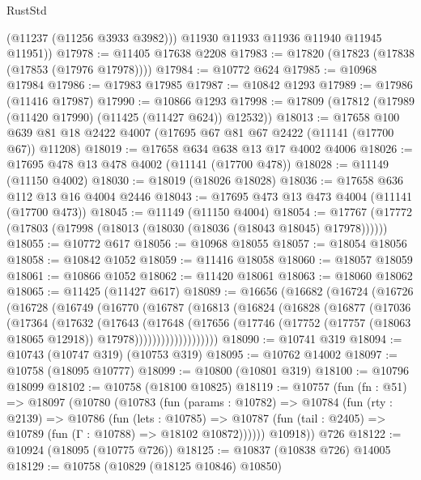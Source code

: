 \begin{lexlean}{RustStd}
\begin{coremodule}
          (@11237 (@11256 @3933 @3982)))
        @11930
        @11933
        @11936
        @11940
        @11945
        @11951))
@17978 := @11405 @17638 @2208
@17983 := @17820 (@17823 (@17838 (@17853 (@17976 @17978))))
@17984 := @10772 @624
@17985 := @10968 @17984
@17986 := @17983 @17985
@17987 := @10842 @1293
@17989 := @17986 (@11416 @17987)
@17990 := @10866 @1293
@17998 := @17809 (@17812 (@17989 (@11420 @17990) (@11425 (@11427 @624)) @12532))
@18013 := @17658
    @100
    @639
    @81
    @18
    @2422
    @4007
    (@17695 @67 @81 @67 @2422 (@11141 (@17700 @67)) @11208)
@18019 := @17658 @634 @638 @13 @17 @4002 @4006
@18026 := @17695 @478 @13 @478 @4002 (@11141 (@17700 @478))
@18028 := @11149 (@11150 @4002)
@18030 := @18019 (@18026 @18028)
@18036 := @17658 @636 @112 @13 @16 @4004 @2446
@18043 := @17695 @473 @13 @473 @4004 (@11141 (@17700 @473))
@18045 := @11149 (@11150 @4004)
@18054 := @17767 (@17772 (@17803 (@17998 (@18013 (@18030 (@18036 (@18043 @18045) @17978))))))
@18055 := @10772 @617
@18056 := @10968 @18055
@18057 := @18054 @18056
@18058 := @10842 @1052
@18059 := @11416 @18058
@18060 := @18057 @18059
@18061 := @10866 @1052
@18062 := @11420 @18061
@18063 := @18060 @18062
@18065 := @11425 (@11427 @617)
@18089 := @16656
    (@16682
      (@16724
        (@16726
          (@16728
            (@16749
              (@16770
                (@16787
                  (@16813
                    (@16824
                      (@16828
                        (@16877
                          (@17036
                            (@17364
                              (@17632
                                (@17643
                                  (@17648
                                    (@17656
                                      (@17746
                                        (@17752
                                          (@17757 (@18063 @18065 @12918))
                                          @17978)))))))))))))))))))
@18090 := @10741 @319
@18094 := @10743 (@10747 @319) (@10753 @319)
@18095 := @10762 @14002
@18097 := @10758 (@18095 @10777)
@18099 := @10800 (@10801 @319)
@18100 := @10796 @18099
@18102 := @10758 (@18100 @10825)
@18119 := @10757
    (fun (fn : @51) =>
    @18097
      (@10780
        (@10783
          (fun (params : @10782) =>
          @10784
            (fun (rty : @2139) =>
            @10786
              (fun (lets : @10785) =>
              @10787 (fun (tail : @2405) => @10789 (fun (Γ : @10788) => @18102 @10872))))))
        @10918))
    @726
@18122 := @10924 (@18095 (@10775 @726))
@18125 := @10837 (@10838 @726) @14005
@18129 := @10758 (@10829 (@18125 @10846) @10850)

\end{coremodule}
\end{lexlean}
